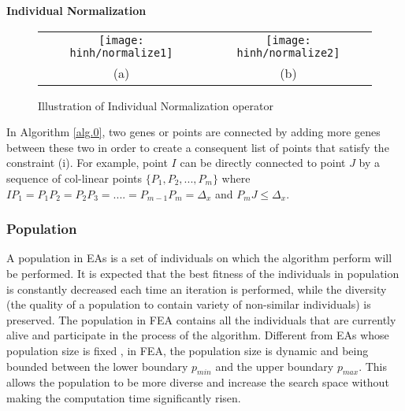 \documentclass[final]{elsarticle}
\begin{document}
\begin{algorithm}[H]
	\SetAlgoLined
		\caption{\textbf{Individual Normalization}} 
		\label{alg.0}
\end{algorithm} 
\begin{figure*}[h]
	\begin{tabular}{cc}
		\texttt{[image: hinh/normalize1]}&\texttt{[image: hinh/normalize2]}\\
		(a) &(b)\\
	\end{tabular}
	\centering
	\caption{Illustration of Individual Normalization operator
	}
	\label{Fig.6}       %
\end{figure*}

In Algorithm \ref*{alg.0}, two genes or points are connected by adding more genes between these two in order to create a consequent list of points that satisfy the constraint (i). For example, point $ I $ can be directly connected to point $ J $ by a sequence of col-linear points $\{P_1,P_2,...,P_m\}$ where $IP_1=P_1P_2=P_2P_3=....=P_{m-1}P_m=\Delta_x$ and $P_mJ \leq \Delta_x$.\\

\subsubsection{Population}

A population in EAs is a set of individuals on which the algorithm perform will be performed. It is expected that the best fitness of the individuals in population is constantly decreased each time an iteration is performed, while the diversity (the quality of a population to contain variety of non-similar individuals) is preserved. The population in FEA contains all the individuals that are currently alive and participate in the process of the algorithm. Different from EAs whose population size is fixed , in FEA, the population size is dynamic and being bounded between the lower boundary $p_{min}$ and the upper boundary $p_{max}$. This allows the population to be more diverse and increase the search space without making the computation time significantly risen.
\end{document}
